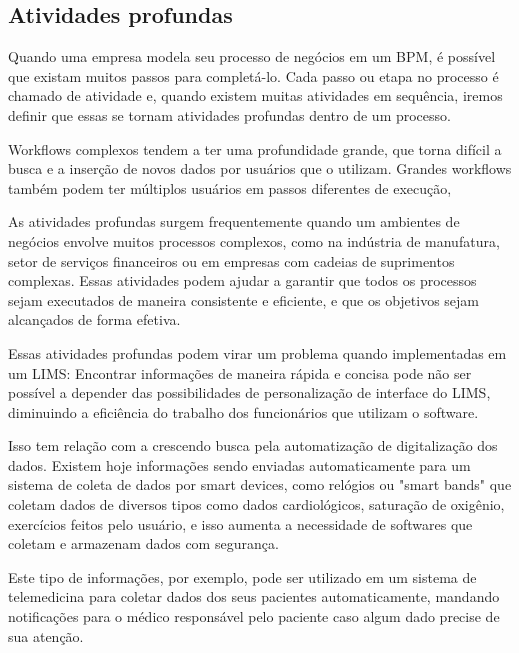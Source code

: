 \subsection{Atividades profundas}


Quando uma empresa modela seu processo de negócios em um BPM, é possível que existam muitos passos para completá-lo. Cada passo ou etapa no processo é chamado de atividade e, quando existem muitas atividades em sequência, iremos definir que essas se tornam atividades profundas dentro de um processo.


Workflows complexos tendem a ter uma profundidade grande, que torna difícil a busca e a inserção de novos dados por usuários que o utilizam. Grandes workflows também podem ter múltiplos usuários em passos diferentes de execução, 

As atividades profundas surgem frequentemente quando um ambientes de negócios envolve muitos processos complexos, como na indústria de manufatura, setor de serviços financeiros ou em empresas com cadeias de suprimentos complexas. Essas atividades podem ajudar a garantir que todos os processos sejam executados de maneira consistente e eficiente, e que os objetivos sejam alcançados de forma efetiva.


Essas atividades profundas podem virar um problema quando implementadas em um LIMS: Encontrar informações de maneira rápida e concisa pode não ser possível a depender das possibilidades de personalização de interface do LIMS, diminuindo a eficiência do trabalho dos funcionários que utilizam o software.


Isso tem relação com a crescendo busca pela automatização de digitalização dos dados. Existem hoje informações sendo enviadas automaticamente para um sistema de coleta de dados por smart devices, como relógios ou "smart bands" que coletam dados de diversos tipos como dados cardiológicos, saturação de oxigênio, exercícios feitos pelo usuário, e isso aumenta a necessidade de softwares que coletam e armazenam dados com segurança.

Este tipo de informações, por exemplo, pode ser utilizado em um sistema de telemedicina para coletar dados dos seus pacientes automaticamente, mandando notificações para o médico responsável pelo paciente caso algum dado precise de sua atenção.

